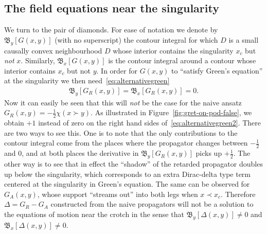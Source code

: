 \documentclass[12pt]{article}
\def\bea{\begin{equation}\begin{aligned}}
\def\eea{\end{aligned}\end{equation}}
\begin{document}
\subsection{The field equations near the singularity}
We turn to the pair of diamonds. For ease of notation we denote by $\mathfrak B_y\left[G(x,y)\right]$ (with no superscript) the contour integral for which $D$ is a small causally convex neighbourhood $D$ whose interior contains the singularity $x_c$ but \emph{not} $x$. Similarly, $\mathfrak B_x\left[G(x,y)\right]$ is the contour integral around a contour whose interior contains $x_c$ but not $y$. In order for $G(x,y)$ to ``satisfy Green's equation'' at the singularity we then need~\eqref{eq:alternativegreen}
\bea
\label{eq:alternativegreen2}
\mathfrak B_y\left[G_R(x,y)\right] =\mathfrak B_x\left[G_R(x,y)\right] = 0.
\eea
Now it can easily be seen that this will \emph{not} be the case for the naive ansatz $G_R(x,y)=-\frac12\chi(x\succ y)$. As illustrated in Figure~\ref{fig:gret-on-pod-false}, we obtain $+1$ instead of zero on the right hand sides of~\eqref{eq:alternativegreen2}. There are two ways to see this. One is to note that the only contributions to the contour integral come from the places where the propagator changes between $-\frac12$ and $0$, and at both places the derivative in $\mathfrak B _y\left[G_R(x,y)\right]$ picks up $+\frac12$. The other way is to see that in effect the ``shadow'' of the retarded propagator doubles up below the singularity, which corresponds to an extra Dirac-delta type term centered at the singularity in Green's equation. The same can be observed for $G_A(x,y)$, whose support ``streams out'' into both legs when $x\prec x_c$. Therefore $\Delta=G_R-G_A$ constructed from the naive propagators will not be a solution to the equations of motion near the crotch in the sense that $\mathfrak B_y\left[\Delta(x,y)\right]\neq 0$ and $\mathfrak B_x\left[\Delta(x,y)\right]\neq 0$.
\end{document}
